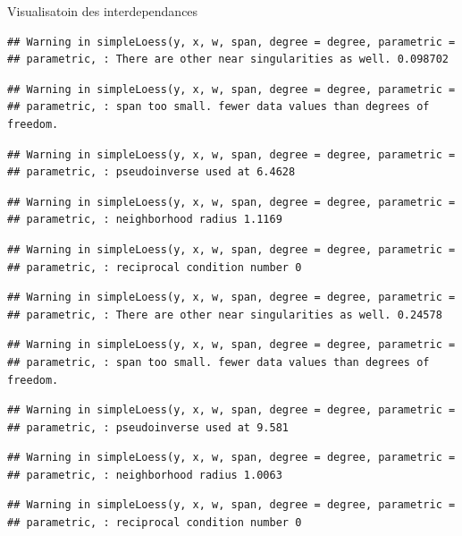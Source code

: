 \documentclass[11pt,ignorenonframetext,]{beamer}
\begin{document}
\begin{frame}[fragile]{Visualisatoin des interdependances}
\begin{verbatim}
## Warning in simpleLoess(y, x, w, span, degree = degree, parametric =
## parametric, : There are other near singularities as well. 0.098702
\end{verbatim}

\begin{verbatim}
## Warning in simpleLoess(y, x, w, span, degree = degree, parametric =
## parametric, : span too small. fewer data values than degrees of freedom.
\end{verbatim}

\begin{verbatim}
## Warning in simpleLoess(y, x, w, span, degree = degree, parametric =
## parametric, : pseudoinverse used at 6.4628
\end{verbatim}

\begin{verbatim}
## Warning in simpleLoess(y, x, w, span, degree = degree, parametric =
## parametric, : neighborhood radius 1.1169
\end{verbatim}

\begin{verbatim}
## Warning in simpleLoess(y, x, w, span, degree = degree, parametric =
## parametric, : reciprocal condition number 0
\end{verbatim}

\begin{verbatim}
## Warning in simpleLoess(y, x, w, span, degree = degree, parametric =
## parametric, : There are other near singularities as well. 0.24578
\end{verbatim}

\begin{verbatim}
## Warning in simpleLoess(y, x, w, span, degree = degree, parametric =
## parametric, : span too small. fewer data values than degrees of freedom.
\end{verbatim}

\begin{verbatim}
## Warning in simpleLoess(y, x, w, span, degree = degree, parametric =
## parametric, : pseudoinverse used at 9.581
\end{verbatim}

\begin{verbatim}
## Warning in simpleLoess(y, x, w, span, degree = degree, parametric =
## parametric, : neighborhood radius 1.0063
\end{verbatim}

\begin{verbatim}
## Warning in simpleLoess(y, x, w, span, degree = degree, parametric =
## parametric, : reciprocal condition number 0
\end{verbatim}


\end{frame}
\end{document}
